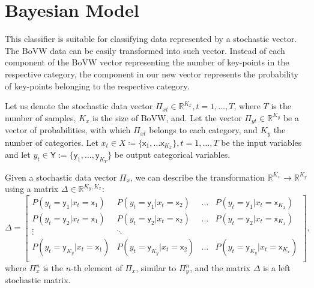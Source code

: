 \section{Bayesian Model}
This classifier is suitable for classifying data represented by a stochastic vector. The BoVW data can be easily transformed into such vector. Instead of each component of the BoVW vector representing the number of key-points in the respective category, the component in our new vector represents the probability of key-points belonging to the respective category.

Let us denote the stochastic data vector $\Pi_{xt} \in \mathbb{R}^{K_x}, t=1,\dots,T$, where $T$ is the number of samples, $K_x$ is the size of BoVW, and. Let the vector $\Pi_{yt}\in \mathbb{R}^{K_y}$ be a vector of probabilities, with which $\Pi_{xt}$ belongs to each category, and $K_y$ the number of categories.
Let $x_t \in X \coloneqq \lbrace \mathsf{x}_1, \dots \mathsf{x}_{K_x} \rbrace, t = 1,\dots,T$ be the input variables and let $y_t \in \mathsf{Y} := \lbrace \mathsf{y}_1, \dots, \mathsf{y}_{K_Y} \rbrace$ be output categorical variables. 

Given a stochastic data vector $\Pi_x$, we can describe the transformation $\mathbb{R}^{K_x} \rightarrow \mathbb{R}^{K_y}$ using a matrix $\Delta \in \mathbb{R}^{K_y, K_x}$:
\begin{equation}
    \Delta =
    \begin{bmatrix}
        P(y_t = \mathsf{y}_1 | x_t = \mathsf{x}_1) & P(y_t = \mathsf{y}_1 | x_t = \mathsf{x}_2) & \dots & P(y_t = \mathsf{y}_1 | x_t = \mathsf{x}_{K_x})\\
        P(y_t = \mathsf{y}_2 | x_t = \mathsf{x}_1) & P(y_t = \mathsf{y}_2 | x_t = \mathsf{x}_2) & \dots & P(y_t = \mathsf{y}_2 | x_t = \mathsf{x}_{K_x})\\
        \vdots & \ddots\\
        P(y_t = \mathsf{y}_{K_y} | x_t = \mathsf{x}_1) & P(y_t = \mathsf{y}_{K_y} | x_t = \mathsf{x}_2) & \dots & P(y_t = \mathsf{y}_{K_y} | x_t = \mathsf{x}_{K_x})\\
    \end{bmatrix},
\end{equation}
where $\Pi_x^n$ is the $n$-th element of $\Pi_x$, similar to $\Pi_y^n$, and the matrix $\Delta$ is a left stochastic matrix.

